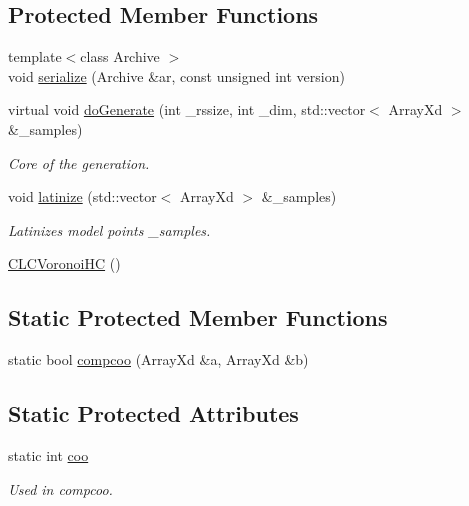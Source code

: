 \subsection*{Protected Member Functions}
\begin{DoxyCompactItemize}
\item 
{\footnotesize template$<$class Archive $>$ }\\void \hyperlink{class_go_s_u_m_1_1_c_l_c_voronoi_h_c_a98f588c33a8f2e2f4b681b48d63f2109}{serialize} (Archive \&ar, const unsigned int version)
\item 
virtual void \hyperlink{class_go_s_u_m_1_1_c_l_c_voronoi_h_c_a02e90ea8deecafc3b398709f748fa9af}{do\-Generate} (int \-\_\-rssize, int \-\_\-dim, std\-::vector$<$ Array\-Xd $>$ \&\-\_\-samples)
\begin{DoxyCompactList}\small\item\em Core of the generation. \end{DoxyCompactList}\item 
void \hyperlink{class_go_s_u_m_1_1_c_l_c_voronoi_h_c_a5be4f6091986273bdbe421f3b46be9b6}{latinize} (std\-::vector$<$ Array\-Xd $>$ \&\-\_\-samples)
\begin{DoxyCompactList}\small\item\em Latinizes model points \-\_\-samples. \end{DoxyCompactList}\item 
\hyperlink{class_go_s_u_m_1_1_c_l_c_voronoi_h_c_a3f6345253188de13d06c8af6ceab9f16}{C\-L\-C\-Voronoi\-H\-C} ()
\end{DoxyCompactItemize}
\subsection*{Static Protected Member Functions}
\begin{DoxyCompactItemize}
\item 
static bool \hyperlink{class_go_s_u_m_1_1_c_l_c_voronoi_h_c_a5632fe4349c0823b469ed38f005d7717}{compcoo} (Array\-Xd \&a, Array\-Xd \&b)
\end{DoxyCompactItemize}
\subsection*{Static Protected Attributes}
\begin{DoxyCompactItemize}
\item 
static int \hyperlink{class_go_s_u_m_1_1_c_l_c_voronoi_h_c_ad5ec0a5f8490d9de0998266c69ff9ab1}{coo}
\begin{DoxyCompactList}\small\item\em Used in compcoo. \end{DoxyCompactList}\end{DoxyCompactItemize}
